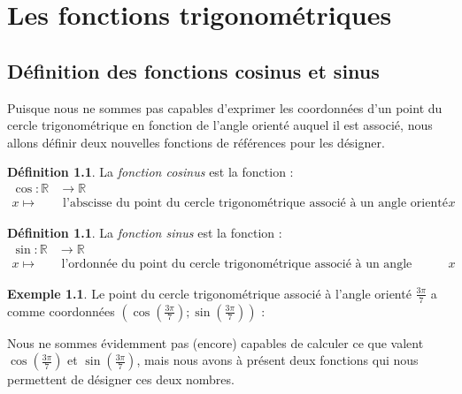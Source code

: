 \documentclass[a4paper,fontsize=13pt]{scrreprt}
\theoremstyle{plain}
\theoremstyle{definition}
\newtheorem{déf}[subsection]{Définition}
\newtheorem{exe}[subsection]{Exemple}
\newcommand{\rr}{\mathbb{R}}
\newcommand {\axes} {
	\draw[thick, ->] (\xmin,0) -- (\xmax+1,0);
	\draw[thick, ->] (0,\ymin) -- (0,\ymax+1);
	\draw (0,\ymax+0.5) node [left] {$y$};
	\draw (\xmax+0.5, 0) node [below] {$x$};
	\draw[thick] (-0.15,1)--(0.15,1) (1,-0.15)--(1,0.15);
	\draw (0,1)node[left]{$1$} (1,0)node[below]{$1$};
}
\begin{document}
\chapter{Les fonctions trigonométriques}

\section{Définition des fonctions cosinus et sinus}

Puisque nous ne sommes pas capables d'exprimer les coordonnées d'un point du cercle trigonométrique en fonction de l'angle orienté auquel il est associé, nous allons définir deux nouvelles fonctions de références pour les désigner.

\begin{déf}
La \emph{fonction cosinus} est la fonction :
\begin{align*}
		\cos : \rr &\to \rr \\
		x \mapsto& \mbox{~l'abscisse du point du cercle trigonométrique associé à un angle orienté de mesure $x$}
		\end{align*}
\end{déf}
\begin{déf}
La \emph{fonction sinus} est la fonction :
\begin{align*}
		\sin : \rr &\to \rr \\
		x \mapsto& \mbox{~l'ordonnée du point du cercle trigonométrique associé à un angle orienté de mesure $x$}
		\end{align*}
\end{déf}
\begin{exe}
Le point du cercle trigonométrique associé à l'angle orienté $\frac{3\pi}{7}$ a comme coordonnées $(\cos (\frac{3\pi}{7}) ; \sin (\frac{3\pi}{7}))$ :
\begin{center}
\end{center}
Nous ne sommes évidemment pas (encore) capables de calculer ce que valent $\cos (\frac{3\pi}{7})$ et $\sin (\frac{3\pi}{7})$, mais nous avons à présent deux fonctions qui nous permettent de désigner ces deux nombres.
\end{exe}
\end{document}
